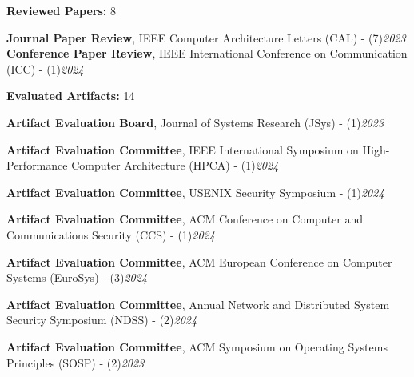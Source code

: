 \documentclass[letterpaper,11pt]{article}
\begin{document}
    \small{\item{
        \textbf{\large Reviewed Papers:} {\large 8}\hfill \\ \vspace{3pt}
    
        \textbf{Journal Paper Review}, IEEE Computer Architecture Letters (CAL) - (7)\hfill \textit{2023} \\ 
        \vspace{3pt}
        \textbf{Conference Paper Review}, IEEE International Conference on Communication (ICC) - (1)\hfill \textit{2024} \\ 
        \vspace{5pt}

        \textbf{\large Evaluated Artifacts:} {\large 14}\hfill \\ \vspace{3pt}

        \textbf{Artifact Evaluation Board}, Journal of Systems Research (JSys) - (1)\hfill \textit{2023} \\ \vspace{3pt}

        \textbf{Artifact Evaluation Committee}, IEEE International Symposium on High-Performance Computer Architecture (HPCA) - (1)\hfill \textit{2024} \\ \vspace{3pt}

        \textbf{Artifact Evaluation Committee}, USENIX Security Symposium - (1)\hfill \textit{2024} \\ \vspace{3pt}

        \textbf{Artifact Evaluation Committee}, ACM Conference on Computer and Communications Security (CCS) - (1)\hfill \textit{2024} \\ \vspace{3pt}

        \textbf{Artifact Evaluation Committee}, ACM European Conference on Computer Systems (EuroSys) - (3)\hfill \textit{2024} \\ \vspace{3pt}

        \textbf{Artifact Evaluation Committee}, Annual Network and Distributed System Security Symposium (NDSS) - (2)\hfill \textit{2024} \\ \vspace{3pt}

        \textbf{Artifact Evaluation Committee}, ACM Symposium on Operating Systems Principles (SOSP) - (2)\hfill \textit{2023} \\ \vspace{3pt}

}}
\end{document}
